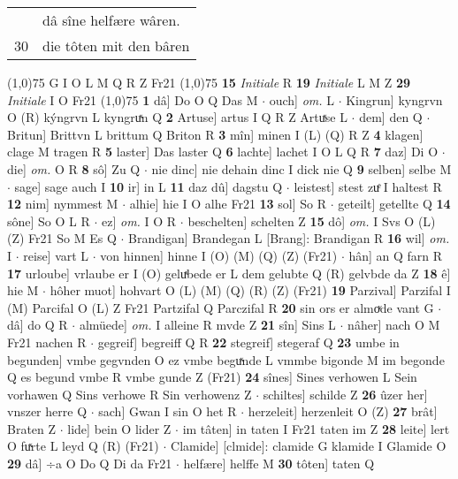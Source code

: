 \documentclass[8pt,a4paper,notitlepage]{article}
\begin{document}
\begin{table}[ht]
\begin{minipage}[t]{0.5\linewidth}
\begin{tabular}{rl}
 & dâ sîne helfære wâren.\\ 
30 & die tôten mit den bâren\\ 
\end{tabular}
\scriptsize
\line(1,0){75} \newline
G I O L M Q R Z Fr21 \newline
\line(1,0){75} \newline
\textbf{15} \textit{Initiale} R  \textbf{19} \textit{Initiale} L M Z  \textbf{29} \textit{Initiale} I O Fr21  \newline
\line(1,0){75} \newline
\textbf{1} dâ] Do O Q Das M  $\cdot$ ouch] \textit{om.} L  $\cdot$ Kingrun] kyngrvn O (R) kýngrvn L kyngruͯn Q \textbf{2} Artuse] artus I Q R Z Artuͯse L  $\cdot$ dem] den Q  $\cdot$ Britun] Brittvn L brittum Q Briton R \textbf{3} mîn] minen I (L) (Q) R Z \textbf{4} klagen] clage M tragen R \textbf{5} laster] Das laster Q \textbf{6} lachte] lachet I O L Q R \textbf{7} daz] Di O  $\cdot$ die] \textit{om.} O R \textbf{8} sô] Zu Q  $\cdot$ nie dinc] nie dehain dinc I dick nie Q \textbf{9} selben] selbe M  $\cdot$ sage] sage auch I \textbf{10} ir] in L \textbf{11} daz dû] dagstu Q  $\cdot$ leistest] stest zuͤ I haltest R \textbf{12} nim] nymmest M  $\cdot$ alhie] hie I O alhe Fr21 \textbf{13} sol] So R  $\cdot$ geteilt] getellte Q \textbf{14} sône] So O L R  $\cdot$ ez] \textit{om.} I O R  $\cdot$ beschelten] schelten Z \textbf{15} dô] \textit{om.} I Svs O (L) (Z) Fr21 So M Es Q  $\cdot$ Brandigan] Brandegan L [Brang]: Brandigan R \textbf{16} wil] \textit{om.} I  $\cdot$ reise] vart L  $\cdot$ von hinnen] hinne I (O) (M) (Q) (Z) (Fr21)  $\cdot$ hân] an Q farn R \textbf{17} urloube] vrlaube er I (O) geluͯbede er L dem gelubte Q (R) gelvbde da Z \textbf{18} ê] hie M  $\cdot$ hôher muot] hohvart O (L) (M) (Q) (R) (Z) (Fr21) \textbf{19} Parzival] Parzifal I (M) Parcifal O (L) Z Fr21 Partzifal Q Parczifal R \textbf{20} sin ors er almoͮde vant G  $\cdot$ dâ] do Q R  $\cdot$ almüede] \textit{om.} I alleine R mvde Z \textbf{21} sîn] Sins L  $\cdot$ nâher] nach O M Fr21 nachen R  $\cdot$ gegreif] begreiff Q R \textbf{22} stegreif] stegeraf Q \textbf{23} umbe in begunden] vmbe gegvnden O ez vmbe beguͯnde L vmmbe bigonde M im begonde Q es begund vmbe R vmbe gunde Z (Fr21) \textbf{24} sînes] Sines verhowen L Sein vorhawen Q Sins verhowe R Sin verhowenz Z  $\cdot$ schiltes] schilde Z \textbf{26} ûzer her] vnszer herre Q  $\cdot$ sach] Gwan I sin O het R  $\cdot$ herzeleit] herzenleit O (Z) \textbf{27} brât] Braten Z  $\cdot$ lide] bein O lider Z  $\cdot$ im tâten] in taten I Fr21 taten im Z \textbf{28} leite] lert O fuͯrte L leyd Q (R) (Fr21)  $\cdot$ Clamide] [clmide]: clamide G klamide I Glamide O \textbf{29} dâ] ÷a O Do Q Di da Fr21  $\cdot$ helfære] helffe M \textbf{30} tôten] taten Q \newline

\end{minipage}
\end{table}
\end{document}
